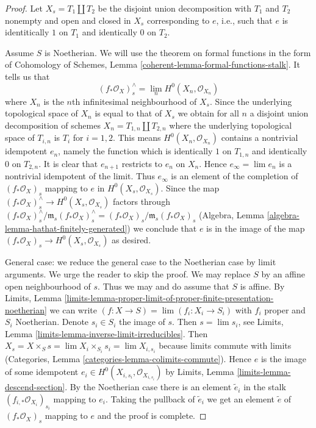 \begin{proof}
Let $X_s = T_1 \amalg T_2$ be the disjoint union decomposition
with $T_1$ and $T_2$ nonempty and open and closed in $X_s$
corresponding to $e$, i.e., such that $e$ is identitically $1$
on $T_1$ and identically $0$ on $T_2$.

\medskip\noindent
Assume $S$ is Noetherian. We will use the theorem on formal functions
in the form of Cohomology of Schemes, Lemma
\ref{coherent-lemma-formal-functions-stalk}.
It tells us that
$$
(f_*\mathcal{O}_X)_s^\wedge = \lim_n H^0(X_n, \mathcal{O}_{X_n})
$$
where $X_n$ is the $n$th infinitesimal neighbourhood of $X_s$.
Since the underlying topological space of $X_n$ is equal to that
of $X_s$ we obtain for all $n $ a disjoint union decomposition of schemes
$X_n = T_{1, n} \amalg T_{2, n}$ where the underlying topological space
of $T_{i, n}$ is $T_i$ for $i = 1, 2$. This means
$H^0(X_n, \mathcal{O}_{X_n})$ contains a nontrivial idempotent $e_n$,
namely the function which is identically $1$ on $T_{1, n}$ and
identically $0$ on $T_{2, n}$. It is clear that $e_{n + 1}$
restricts to $e_n$ on $X_n$. Hence $e_\infty = \lim e_n$
is a nontrivial idempotent of the limit. Thus $e_\infty$
is an element of the completion of $(f_*\mathcal{O}_X)_s$
mapping to $e$ in $H^0(X_s, \mathcal{O}_{X_s})$.
Since the map $(f_*\mathcal{O}_X)_s^\wedge \to H^0(X_s, \mathcal{O}_{X_s})$
factors through
$(f_*\mathcal{O}_X)^\wedge_s / \mathfrak m_s (f_*\mathcal{O}_X)_s^\wedge =
(f_*\mathcal{O}_X)_s / \mathfrak m_s (f_*\mathcal{O}_X)_s$
(Algebra, Lemma \ref{algebra-lemma-hathat-finitely-generated})
we conclude that $e$ is in the image of the
map $(f_*\mathcal{O}_X)_s \to H^0(X_s, \mathcal{O}_{X_s})$
as desired.

\medskip\noindent
General case: we reduce the general case to the Noetherian case by
limit arguments. We urge the reader to skip the proof.
We may replace $S$ by an affine open neighbourhood of $s$.
Thus we may and do assume that $S$ is affine. By Limits, Lemma
\ref{limits-lemma-proper-limit-of-proper-finite-presentation-noetherian}
we can write $(f : X \to S) = \lim (f_i : X_i \to S_i)$ with $f_i$
proper and $S_i$ Noetherian. Denote $s_i \in S_i$ the image of $s$.
Then $s = \lim s_i$, see
Limits, Lemma \ref{limits-lemma-inverse-limit-irreducibles}.
Then $X_s = X \times_S s = \lim X_i \times_{S_i} s_i = \lim X_{i, s_i}$
because limits commute with limits
(Categories, Lemma \ref{categories-lemma-colimits-commute}).
Hence $e$ is the image of some idempotent
$e_i \in H^0(X_{i, s_i}, \mathcal{O}_{X_{i, s_i}})$
by Limits, Lemma \ref{limits-lemma-descend-section}.
By the Noetherian case there is an element $\tilde e_i$
in the stalk $(f_{i, *}\mathcal{O}_{X_i})_{s_i}$ mapping
to $e_i$. Taking the pullback of $\tilde e_i$ we get an
element $\tilde e$ of $(f_*\mathcal{O}_X)_s$ mapping
to $e$ and the proof is complete.
\end{proof}

